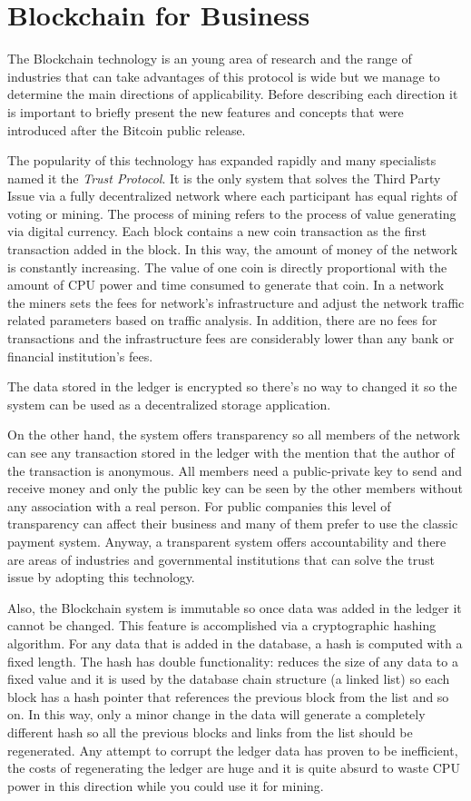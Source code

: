 \section{Blockchain for Business}
\label{sec:chapter1-sec2}
The Blockchain technology is an young area of research and the range of industries that can take advantages of this protocol is wide but we manage to determine the main directions of applicability. Before describing each direction it is important to briefly present the new features and concepts that were introduced after the Bitcoin public release.

The popularity of this technology has expanded rapidly and many specialists named it the \emph{Trust Protocol}. It is the only system that solves the Third Party Issue via a fully decentralized network where each participant has equal rights of voting or mining. The process of mining refers to the process of value generating via digital currency. Each block contains a new coin transaction as the first transaction added in the block. In this way, the amount of money of the network is constantly increasing. The value of one coin is directly proportional with the amount of CPU power and time consumed to generate that coin.
In a network the miners sets the fees for network's infrastructure and adjust the network traffic related parameters based on traffic analysis. In addition, there are no fees for transactions and the infrastructure fees are considerably lower than any bank or financial institution's fees.

The data stored in the ledger is encrypted so there's no way to changed it so the system can be used as a decentralized storage application.

On the other hand, the system offers transparency so all members of the network can see any transaction stored in the ledger with the mention that the author of the transaction is anonymous. All members need a public-private key to send and receive money and only the public key can be seen by the other members without any association with a real person. For public companies this level of transparency can affect their business and many of them prefer to use the classic payment system. Anyway, a transparent system offers accountability and there are areas of industries and governmental institutions that can solve the trust issue by adopting this technology. 

Also, the Blockchain system is immutable so once data was added in the ledger it cannot be changed. This feature is accomplished via a cryptographic hashing algorithm. For any data that is added in the database, a hash is computed with a fixed length. The hash has double functionality: reduces the size of any data to a fixed value and it is used by the database chain structure (a linked list) so each block has a hash pointer that references the previous block from the list and so on. In this way, only a minor change in the data will generate a completely different hash so all the previous blocks and links from the list should be regenerated. Any attempt to corrupt the ledger data has proven to be inefficient, the costs of regenerating the ledger are huge and it is quite absurd to waste CPU power in this direction while you could use it for mining.

